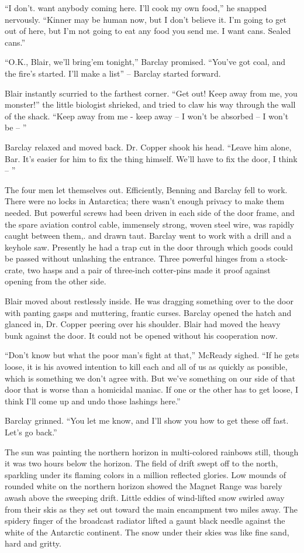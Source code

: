 \documentclass[ebook,oneside,11pt]{memoir}				%
\begin{document}
``I don't. want anybody coming here. I'll cook my own food,'' he snapped nervously. ``Kinner may be human now, but I don't believe it. I'm going to get out of here, but I'm not going to eat any food you send me. I want cans. Sealed cans.''

``O.K., Blair, we'll bring'em tonight,'' Barclay promised. ``You've got coal, and the fire's started. I'll make a list'' -- Barclay started forward.

Blair instantly scurried to the farthest corner. ``Get out! Keep away from me, you monster!'' the little biologist shrieked, and tried to claw his way through the wall of the shack. ``Keep away from me - keep away -- I won't be absorbed -- I won't be -- ''

Barclay relaxed and moved back. Dr. Copper shook his head. ``Leave him alone, Bar. It's easier for him to fix the thing himself. We'll have to fix the door, I think -- ''

The four men let themselves out. Efficiently, Benning and Barclay fell to work. There were no locks in Antarctica; there wasn't enough privacy to make them needed. But powerful screws had been driven in each side of the door frame, and the spare aviation control cable, immensely strong, woven steel wire, was rapidly caught between them,. and drawn taut. Barclay went to work with a drill and a keyhole saw. Presently he had a trap cut in the door through which goods could be passed without unlashing the entrance. Three powerful hinges from a stock-crate, two hasps and a pair of three-inch cotter-pins made it proof against opening from the other side.

Blair moved about restlessly inside. He was dragging something over to the door with panting gasps and muttering, frantic curses. Barclay opened the hatch and glanced in, Dr. Copper peering over his shoulder. Blair had moved the heavy bunk against the door. It could not be opened without his cooperation now.

``Don't know but what the poor man's fight at that,'' McReady sighed. ``If he gets loose, it is his avowed intention to kill each and all of us as quickly as possible, which is something we don't agree with. But we've something on our side of that door that is worse than a homicidal maniac. If one or the other has to get loose, I think I'll come up and undo those lashings here.''

Barclay grinned. ``You let me know, and I'll show you how to get these off fast. Let's go back.''

The sun was painting the northern horizon in multi-colored rainbows still, though it was two hours below the horizon. The field of drift swept off to the north, sparkling under its flaming colors in a million reflected glories. Low mounds of rounded white on the northern horizon showed the Magnet Range was barely awash above the sweeping drift. Little eddies of wind-lifted snow swirled away from their skis as they set out toward the main encampment two miles away. The spidery finger of the broadcast radiator lifted a gaunt black needle against the white of the Antarctic continent. The snow under their skies was like fine sand, hard and gritty.
\end{document}
